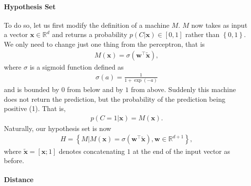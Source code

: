\documentclass{report}
\newcommand{\vect}[1]{\mathbf{#1}}
\newcommand{\vx}[0]{\vect{x}}
\newcommand{\vw}[0]{\vect{w}}
\newcommand{\sigmoid}{\sigma}
\begin{document}
\paragraph{Hypothesis Set} 

To do so, let us first modify the definition of a machine $M$. $M$ now takes as
input a vector $\vx \in \mathbb{R}^d$ and returns a probability $p(C|\vx) \in
\left[ 0, 1\right]$ rather than $\left\{ 0, 1\right\}$. We only need to change
just one thing from the perceptron, that is
\begin{align}
    \label{eq:logreg}
    M(\vx) = \sigmoid(\vw^\top \tilde{\vx}),
\end{align}
where $\sigmoid$ is a sigmoid function defined as
\begin{align*}
    \sigmoid(a) = \frac{1}{1 + \exp(-a)}
\end{align*}
and is bounded by $0$ from below and by $1$ from above. Suddenly this machine
does not return the prediction, but the probability of the prediction being
positive (1). That is,
\begin{align*}
    p(C=1|\vx) = M(\vx).
\end{align*}
Naturally, our hypothesis set is now
\begin{align*}
    H = \left\{ 
    M | M(\vx) = \sigmoid(\vw^\top \tilde{\vx}), \vw \in \mathbb{R}^{d+1}
    \right\},
\end{align*}
where $\tilde{\vx} = \left[ \vx; 1\right]$ denotes concatenating $1$ at the end
of the input vector as before. 

\paragraph{Distance}
\end{document}

